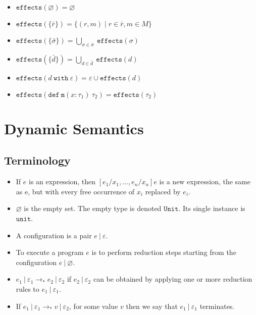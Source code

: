 \documentclass{llncs}
\newcommand{\keywadj}[1]{\mathtt{#1}}
\newcommand{\keyw}[1]{\keywadj{#1}~}
\begin{document}
\begin{itemize}
	\item $\keywadj{effects}(\varnothing) = \varnothing$
	\item $\keywadj{effects}(\{\bar r\}) = \{ (r, m) \mid r \in \bar r, m \in M \}$
	\item $\keywadj{effects}(\{\bar \sigma\}) = \bigcup_{\sigma \in \bar \sigma}~\keywadj{effects}(\sigma)$
	\item $\keywadj{effects}(\{\bar d\}) = \bigcup_{d \in \bar d}~\keywadj{effects}(d)$
	\item $\keywadj{effects}(d~\keyw{with} \varepsilon) = \varepsilon \cup \keywadj{effects}(d)$
	\item $\keywadj{effects}(\keywadj{def~m}(x : \tau_1)~\tau_2) = \keywadj{effects}(\tau_2)$

\end{itemize}

\newpage


\section{Dynamic Semantics}

\subsection{Terminology}

\begin{itemize}
	\item If $e$ is an expression, then $[e_1/x_1, ..., e_n/x_n]e$ is a new expression, the same as e, but with every free occurrence of $x_i$ replaced by $e_i$.
	\item $\varnothing$ is the empty set. The empty type is denoted $\keywadj{Unit}$. Its single instance is $\keywadj{unit}$.
	\item A configuration is a pair $e~|~\varepsilon$.
	\item To execute a program $e$ is to perform reduction steps starting from the configuration $e~|~\varnothing$.
	\item $e_1~|~\varepsilon_1 \longrightarrow_* e_2~|~\varepsilon_2$ if $e_2~|~\varepsilon_2$ can be obtained by applying one or more reduction rules to $e_1~|~\varepsilon_1$.
	\item If $e_1~|~\varepsilon_1 \longrightarrow_* v~|~\varepsilon_2$, for some value $v$ then we say that $e_1~|~\varepsilon_1$ terminates.
\end{itemize}
\end{document}

